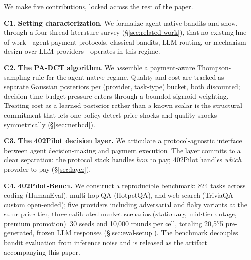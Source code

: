 We make five contributions, locked across the rest of the paper.

\textbf{C1. Setting characterization.} We formalize agent-native bandits and show, through a four-thread literature survey (\S\ref{sec:related-work}), that no existing line of work---agent payment protocols, classical bandits, LLM routing, or mechanism design over LLM providers---operates in this regime.

\textbf{C2. The PA-DCT algorithm.} We assemble a payment-aware Thompson-sampling rule for the agent-native regime. Quality and cost are tracked as separate Gaussian posteriors per (provider, task-type) bucket, both discounted; decision-time budget pressure enters through a bounded sigmoid weighting. Treating cost as a learned posterior rather than a known scalar is the structural commitment that lets one policy detect price shocks and quality shocks symmetrically (\S\ref{sec:method}).

\textbf{C3. The 402Pilot decision layer.} We articulate a protocol-agnostic interface between agent decision-making and payment execution. The layer commits to a clean separation: the protocol stack handles \emph{how} to pay; 402Pilot handles \emph{which} provider to pay (\S\ref{sec:layer}).

\textbf{C4. 402Pilot-Bench.} We construct a reproducible benchmark: 824 tasks across coding (HumanEval), multi-hop QA (HotpotQA), and web search (TriviaQA, custom open-ended); five providers including adversarial and flaky variants at the same price tier; three calibrated market scenarios (stationary, mid-tier outage, premium promotion); 30 seeds and 10{,}000 rounds per cell, totaling 20{,}575 pre-generated, frozen LLM responses (\S\ref{sec:eval-setup}). The benchmark decouples bandit evaluation from inference noise and is released as the artifact accompanying this paper.

